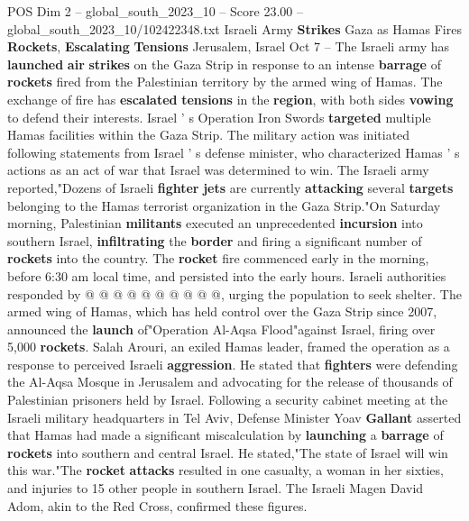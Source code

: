 \begin{textsample}{POS Dim 2 – global\_south\_2023\_10 – Score 23.00 – global\_south\_2023\_10/102422348.txt}  \label{ex:f2_pos_055}
Israeli Army \textbf{Strikes} Gaza as Hamas Fires \textbf{Rockets}, \textbf{Escalating} \textbf{Tensions} Jerusalem, Israel Oct 7 -- The Israeli army has \textbf{launched} \textbf{air} \textbf{strikes} on the Gaza Strip in response to an intense \textbf{barrage} of \textbf{rockets} fired from the Palestinian territory by the armed wing of Hamas.
The exchange of fire has \textbf{escalated} \textbf{tensions} in the \textbf{region}, with both sides \textbf{vowing} to defend their interests.
Israel ' s Operation Iron Swords \textbf{targeted} multiple Hamas facilities within the Gaza Strip.
The military action was initiated following statements from Israel ' s defense minister, who characterized Hamas ' s actions as an act of war that Israel was determined to win.
The Israeli army reported,"Dozens of Israeli \textbf{fighter} \textbf{jets} are currently \textbf{attacking} several \textbf{targets} belonging to the Hamas terrorist organization in the Gaza Strip."On Saturday morning, Palestinian \textbf{militants} executed an unprecedented \textbf{incursion} into southern Israel, \textbf{infiltrating} the \textbf{border} and firing a significant number of \textbf{rockets} into the country.
The \textbf{rocket} fire commenced early in the morning, before 6:30 am local time, and persisted into the early hours.
Israeli authorities responded by @ @ @ @ @ @ @ @ @ @, urging the population to seek shelter.
The armed wing of Hamas, which has held control over the Gaza Strip since 2007, announced the \textbf{launch} of"Operation Al-Aqsa Flood"against Israel, firing over 5,000 \textbf{rockets}.
Salah Arouri, an exiled Hamas leader, framed the operation as a response to perceived Israeli \textbf{aggression}.
He stated that \textbf{fighters} were defending the Al-Aqsa Mosque in Jerusalem and advocating for the release of thousands of Palestinian prisoners held by Israel.
Following a security cabinet meeting at the Israeli military headquarters in Tel Aviv, Defense Minister Yoav \textbf{Gallant} asserted that Hamas had made a significant miscalculation by \textbf{launching} a \textbf{barrage} of \textbf{rockets} into southern and central Israel.
He stated,"The state of Israel will win this war."The \textbf{rocket} \textbf{attacks} resulted in one casualty, a woman in her sixties, and injuries to 15 other people in southern Israel.
The Israeli Magen David Adom, akin to the Red Cross, confirmed these figures.

\end{textsample}
